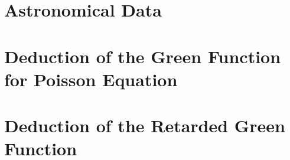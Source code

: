 \documentclass[11pt]{book}
\begin{document}
\chapter{Astronomical Data}\label{A:AstronomicalData}


\chapter{Deduction of the Green Function for Poisson Equation} \label{A:GreenFunctionPoisson}


\chapter{Deduction of the Retarded Green Function} \label{A:GreenFunctionWave}


\backmatter
{}

{}
\end{document}
